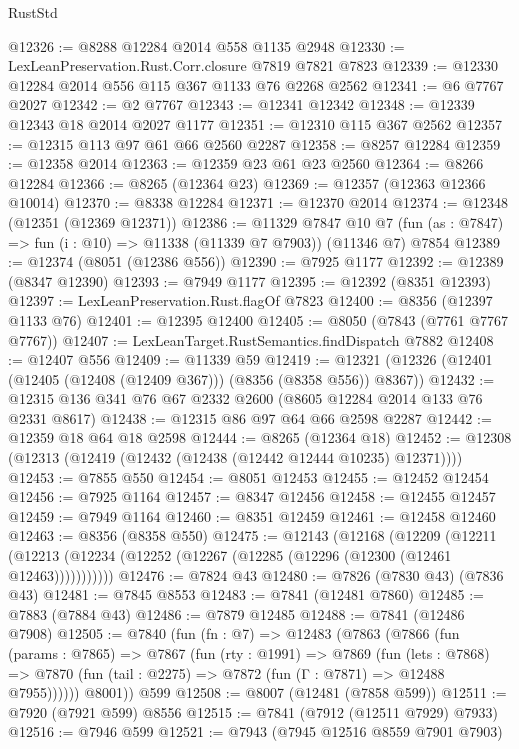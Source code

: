 \begin{lexlean}{RustStd}
\begin{coremodule}
@12326 := @8288 @12284 @2014 @558 @1135 @2948
@12330 := LexLeanPreservation.Rust.Corr.closure @7819 @7821 @7823
@12339 := @12330 @12284 @2014 @556 @115 @367 @1133 @76 @2268 @2562
@12341 := @6 @7767 @2027
@12342 := @2 @7767
@12343 := @12341 @12342
@12348 := @12339 @12343 @18 @2014 @2027 @1177
@12351 := @12310 @115 @367 @2562
@12357 := @12315 @113 @97 @61 @66 @2560 @2287
@12358 := @8257 @12284
@12359 := @12358 @2014
@12363 := @12359 @23 @61 @23 @2560
@12364 := @8266 @12284
@12366 := @8265 (@12364 @23)
@12369 := @12357 (@12363 @12366 @10014)
@12370 := @8338 @12284
@12371 := @12370 @2014
@12374 := @12348 (@12351 (@12369 @12371))
@12386 := @11329
    @7847
    @10
    @7
    (fun (as : @7847) => fun (i : @10) => @11338 (@11339 @7 @7903))
    (@11346 @7)
    @7854
@12389 := @12374 (@8051 (@12386 @556))
@12390 := @7925 @1177
@12392 := @12389 (@8347 @12390)
@12393 := @7949 @1177
@12395 := @12392 (@8351 @12393)
@12397 := LexLeanPreservation.Rust.flagOf @7823
@12400 := @8356 (@12397 @1133 @76)
@12401 := @12395 @12400
@12405 := @8050 (@7843 (@7761 @7767 @7767))
@12407 := LexLeanTarget.RustSemantics.findDispatch @7882
@12408 := @12407 @556
@12409 := @11339 @59
@12419 := @12321 (@12326 (@12401 (@12405 (@12408 (@12409 @367))) (@8356 (@8358 @556)) @8367))
@12432 := @12315 @136 @341 @76 @67 @2332 @2600 (@8605 @12284 @2014 @133 @76 @2331 @8617)
@12438 := @12315 @86 @97 @64 @66 @2598 @2287
@12442 := @12359 @18 @64 @18 @2598
@12444 := @8265 (@12364 @18)
@12452 := @12308 (@12313 (@12419 (@12432 (@12438 (@12442 @12444 @10235) @12371))))
@12453 := @7855 @550
@12454 := @8051 @12453
@12455 := @12452 @12454
@12456 := @7925 @1164
@12457 := @8347 @12456
@12458 := @12455 @12457
@12459 := @7949 @1164
@12460 := @8351 @12459
@12461 := @12458 @12460
@12463 := @8356 (@8358 @550)
@12475 := @12143
    (@12168
      (@12209
        (@12211 (@12213 (@12234 (@12252 (@12267 (@12285 (@12296 (@12300 (@12461 @12463)))))))))))
@12476 := @7824 @43
@12480 := @7826 (@7830 @43) (@7836 @43)
@12481 := @7845 @8553
@12483 := @7841 (@12481 @7860)
@12485 := @7883 (@7884 @43)
@12486 := @7879 @12485
@12488 := @7841 (@12486 @7908)
@12505 := @7840
    (fun (fn : @7) =>
    @12483
      (@7863
        (@7866
          (fun (params : @7865) =>
          @7867
            (fun (rty : @1991) =>
            @7869
              (fun (lets : @7868) =>
              @7870 (fun (tail : @2275) => @7872 (fun (Γ : @7871) => @12488 @7955))))))
        @8001))
    @599
@12508 := @8007 (@12481 (@7858 @599))
@12511 := @7920 (@7921 @599) @8556
@12515 := @7841 (@7912 (@12511 @7929) @7933)
@12516 := @7946 @599
@12521 := @7943 (@7945 @12516 @8559 @7901 @7903)

\end{coremodule}
\end{lexlean}
